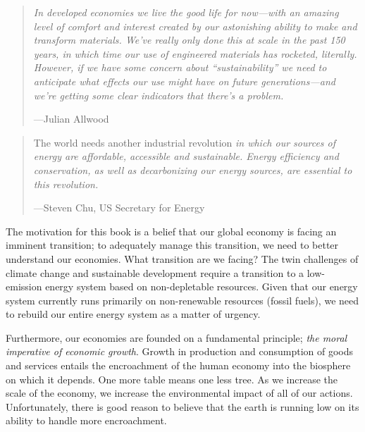 \begin{quotation}
	\emph{In developed economies we live the good life 
	for now---with an amazing level of comfort and interest 
	created by our astonishing ability to 
	make and transform materials. 
	We've really only done this at scale in the past 150 years, 
	in which time our use of engineered materials has rocketed, 
	literally. 
	However, if we have some concern about ``sustainability''
	we need to anticipate what effects our use might have 
	on future generations---and we're getting 
	some clear indicators that there's a 
	problem.}~\cite[p.~3]{allwood2012sustainable}

	\hfill---Julian Allwood
\end{quotation}

\begin{quotation}
	The world needs another industrial revolution 
	\emph{in which our sources of energy are affordable, 
	accessible and sustainable. 
	Energy efficiency and conservation, 
	as well as decarbonizing our energy sources, 
	are essential to this revolution.}~\cite[p.~294]{Chu2012}

	\hfill---Steven Chu, US Secretary for Energy
\end{quotation}

The motivation for this book
is a belief that our global economy is
facing an imminent transition;
to adequately manage this transition,
we need to better understand our economies.
What transition are we facing? 
The twin challenges of climate change and 
sustainable development require a transition to a
low-emission energy system based on 
non-depletable resources. 
Given that our energy system currently runs
primarily on non-renewable resources (fossil fuels),
we need to rebuild our entire energy
system as a matter of urgency.

Furthermore,
our economies are founded on a fundamental principle;
\emph{the moral imperative of economic growth}.\cite{Daly1995}
Growth in production and consumption of goods and services
entails the encroachment of the human economy into the
biosphere on which it depends.
One more table means one less tree.
As we increase the scale of the economy,
we increase the environmental impact of all of our actions.
Unfortunately, there is good reason to believe that the earth 
is running low on its ability to handle more encroachment.\cite{UNMEA2005}

